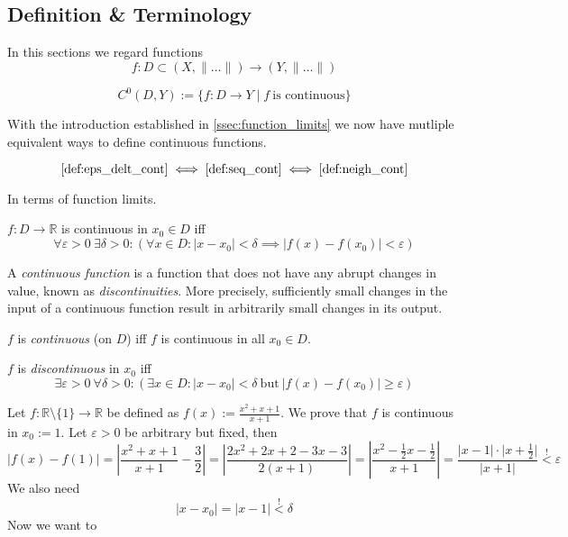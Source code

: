 \subsection{Definition \& Terminology}
In this sections we regard functions
\[f: D \subset (X, \|\ldots\|) \to (Y, \|\ldots\|)\]
\begin{definition}
   \[C^0(D, Y) := \{f: D \to Y \mid f~\text{is continuous}\}\]
\end{definition}
With the introduction established in \cref{ssec:function_limits} we now have mutliple equivalent ways to define continuous functions.
\begin{theorem}
   \[\text{\cref{def:eps_delt_cont}} \iff \text{\cref{def:seq_cont}} \iff \text{\cref{def:neigh_cont}}\]
\end{theorem}
In terms of function limits.
\begin{definition}\label{def:eps_delt_cont}
   \(f: D \to \mathbb{R}\) is continuous in \(x_0 \in D\) iff
   \[\forall \varepsilon > 0~\exists \delta > 0: (\forall x \in D: |x-x_0| < \delta \implies |f(x) - f(x_0)| < \varepsilon)\]
\end{definition}
\begin{remark}[Intuition]
   A \emph{continuous function} is a function that does not have any abrupt changes in value, known as \emph{discontinuities}.
   More precisely, sufficiently small changes in the input of a continuous function result in arbitrarily small changes in its output.
\end{remark}
\begin{remark}[Terminology]
   \(f\) is \emph{continuous} (on \(D\)) iff \(f\) is continuous in all \(x_0 \in D\).

   \(f\) is \emph{discontinuous} in \(x_0\) iff
   \[\exists \varepsilon > 0~\forall \delta > 0: (\exists x \in D: |x - x_0| < \delta~\text{but}~|f(x) - f(x_0)| \geq \varepsilon)\]
\end{remark}
\begin{example}
   Let \(f: \mathbb{R}\setminus\{1\} \to \mathbb{R}\) be defined as \(f(x) := \frac{x^2+x+1}{x+1}\).
   We prove that \(f\) is continuous in \(x_0 := 1\).
   Let \(\varepsilon > 0\) be arbitrary but fixed, then
   \begin{equation}
      \lvert f(x) - f(1)\rvert = \left\lvert\frac{x^2+x+1}{x+1} - \frac{3}{2}\right\rvert = \left\lvert \frac{2x^2+2x+2-3x-3}{2(x+1)}\right\rvert = \left\lvert\frac{x^2-\frac{1}{2}x - \frac{1}{2}}{x+1}\right\rvert = \frac{\lvert x-1\rvert \cdot \lvert x+\frac{1}{2}\rvert}{\lvert x+1\rvert} \overset{!}{<} \varepsilon
   \end{equation}
   We also need
   \begin{equation}
      \lvert x - x_0 \rvert = \lvert x - 1\rvert \overset{!}{<} \delta
   \end{equation}
   Now we want to 
\end{example}
